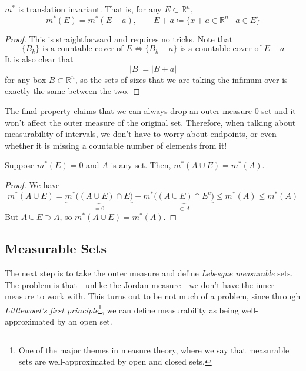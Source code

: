   \begin{theorem}
    $m^\ast$ is translation invariant. That is, for any $E \subset \mathbb{R}^n$, 
    \begin{equation}
      m^\ast (E) = m^\ast (E + a), \qquad E + a \coloneqq \{x + a \in \mathbb{R}^n \mid a \in E \}
    \end{equation}
  \end{theorem}
  \begin{proof}
    This is straightforward and requires no tricks. Note that 
    \begin{equation}
      \{B_k\} \text{ is a countable cover of } E \iff \{B_k + a\} \text{ is a countable cover of } E + a
    \end{equation}
    It is also clear that 
    \begin{equation}
      |B| = |B + a| 
    \end{equation}
    for any box $B \subset \mathbb{R}^n$, so the sets of sizes that we are taking the infimum over is exactly the same between the two. 
  \end{proof}

  The final property claims that we can always drop an outer-measure $0$ set and it won't affect the outer measure of the original set. Therefore, when talking about measurability of intervals, we don't have to worry about endpoints, or even whether it is missing a countable number of elements from it! 

  \begin{lemma}
    Suppose $m^\ast (E) = 0$ and $A$ is any set. Then, $m^\ast (A \cup E) = m^\ast (A)$. 
  \end{lemma}
  \begin{proof}
    We have 
    \begin{equation}
      m^\ast (A \cup E) = \underbrace{m^\ast \big( (A \cup E) \cap E \big)}_{=0} + m^\ast \underbrace{\big( (A \cup E) \cap E^c \big)}_{\subset A} \leq m^\ast (A) \leq m^\ast (A)
    \end{equation}
    But $A \cup E \supset A$, so $m^\ast (A \cup E) = m^\ast (A)$. 
  \end{proof}

\subsection{Measurable Sets}

  The next step is to take the outer measure and define \textit{Lebesgue measurable} sets. The problem is that---unlike the Jordan measure---we don't have the inner measure to work with. This turns out to be not much of a problem, since through \textit{Littlewood's first principle}\footnote{One of the major themes in measure theory, where we say that measurable sets are well-approximated by open and closed sets.}, we can define measurability as being well-approximated by an open set. 
  
